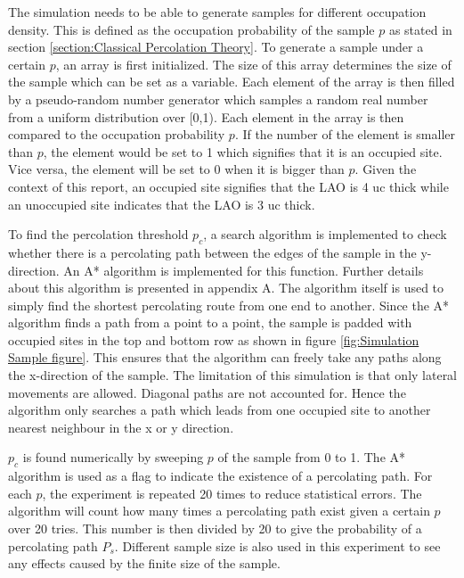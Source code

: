 \documentclass[11pt,a4paper]{report}
\begin{document}
The simulation needs to be able to generate samples for different occupation density. This is defined as the occupation probability of the sample $p$ as stated in section \ref{section:Classical Percolation Theory}. To generate a sample under a certain $p$, an array is first initialized. The size of this array determines the size of the sample which can be set as a variable. Each element of the array is then filled by a pseudo-random number generator which samples a random real number from a uniform distribution over [0,1). Each element in the array is then compared to the occupation probability $p$. If the number of the element is smaller than $p$, the element would be set to 1 which signifies that it is an occupied site. Vice versa, the element will be set to 0 when it is bigger than $p$. Given the context of this report, an occupied site signifies that the LAO is 4 uc thick while an unoccupied site indicates that the LAO is 3 uc thick. 

To find the percolation threshold $p_c$, a search algorithm is implemented to check whether there is a percolating path between the edges of the sample in the y-direction. An A* algorithm is implemented for this function. Further details about this algorithm is presented in appendix A. The algorithm itself is used to simply find the shortest percolating route from one end to another. Since the A* algorithm finds a path from a point to a point, the sample is padded with occupied sites in the top and bottom row as shown in figure \ref{fig:Simulation Sample figure}. This ensures that the algorithm can freely take any paths along the x-direction of the sample. The limitation of this simulation is that only lateral movements are allowed. Diagonal paths are not accounted for. Hence the algorithm only searches a path which leads from one occupied site to another nearest neighbour in the x or y direction.

$p_c$ is found numerically by sweeping $p$ of the sample from 0 to 1. The A* algorithm is used as a flag to indicate the existence of a percolating path. For each $p$, the experiment is repeated 20 times to reduce statistical errors. The algorithm will count how many times a percolating path exist given a certain $p$ over 20 tries. This number is then divided by 20 to give the probability of a percolating path $P_s$. Different sample size is also used in this experiment to see any effects caused by the finite size of the sample.
\end{document}
